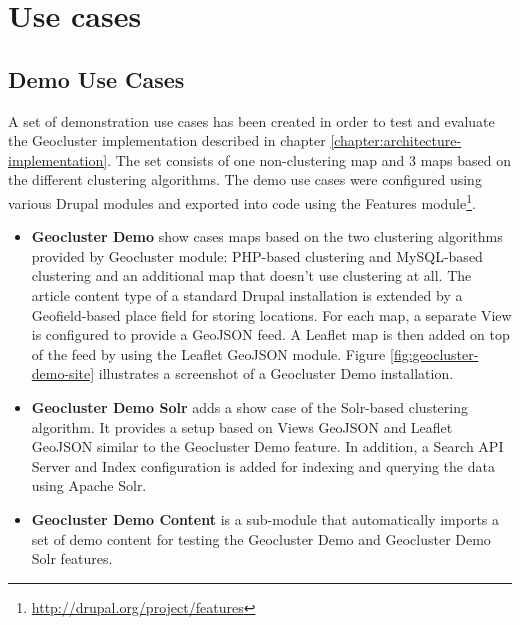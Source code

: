 
%
%

\chapter{Use cases}
\label{chapter:use-cases}

\section{Demo Use Cases}
\label{chapter:use-case-demo}

A set of demonstration use cases has been created in order to test and evaluate the Geocluster implementation described in chapter \ref{chapter:architecture-implementation}. The set consists of one non-clustering map and 3 maps based on the different clustering algorithms. The demo use cases were configured using various Drupal modules and exported into code using the Features module\footnote{\url{http://drupal.org/project/features}}.

\begin{itemize}

\item \textbf{Geocluster Demo} show cases maps based on the two clustering algorithms provided by Geocluster module: PHP-based clustering and MySQL-based clustering and an additional map that doesn't use clustering at all. The article content type of a standard Drupal installation is extended by a Geofield-based place field for storing locations. For each map, a separate View is configured to provide a GeoJSON feed. A Leaflet map is then added on top of the feed by using the Leaflet GeoJSON module. Figure \ref{fig:geocluster-demo-site} illustrates a screenshot of a Geocluster Demo installation.

\item \textbf{Geocluster Demo Solr} adds a show case of the Solr-based clustering algorithm. It provides a setup based on Views GeoJSON and Leaflet GeoJSON similar to the Geocluster Demo feature. In addition, a Search API Server and Index configuration is added for indexing and querying the data using Apache Solr.  

\item \textbf{Geocluster Demo Content} is a sub-module that automatically imports a set of demo content for testing the Geocluster Demo and Geocluster Demo Solr features.

\end{itemize}

